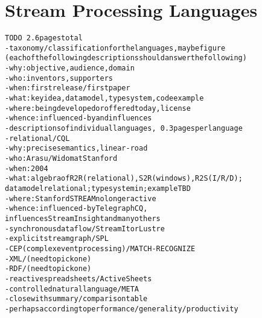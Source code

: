\section{Stream Processing Languages}\label{sec:languages}

\begin{alltt}TODO\scriptsize ~2.6 pages total
- taxonomy/classification for the languages, maybe figure
  (each of the following descriptions should answer the following)
  - why: objective, audience, domain
  - who: inventors, supporters
  - when: first release / first paper
  - what: key idea, data model, type system, code example
  - where: being developed or offered today, license
  - whence: influenced-by and influences
- descriptions of individual languages, ~0.3 pages per language
  - relational / CQL \cite{arasu_babu_widom_2006}
    - why: precise semantics \cite{arasu_widom_2004}, linear-road \cite{arasu_et_al_2004}
    - who: Arasu/Widom at Stanford
    - when: 2004
    - what: algebra of R2R (relational), S2R (windows), R2S (I/R/D);
      data model relational; type system in \cite{soule_et_al_2016}; example TBD
    - where: Stanford STREAM no longer active
    - whence: influenced-by TelegraphCQ \cite{chandrasekaran_et_al_2003},
      influences StreamInsight \cite{ali_et_al_2009} and many others
  - synchronous dataflow / StreamIt \cite{thies_et_al_2002} or Lustre
  - explicit stream graph / SPL \cite{hirzel_schneider_gedik_2017} \cite{soule_et_al_2010}
  - CEP (complex event processing) / MATCH-RECOGNIZE \cite{zemke_et_al_2007} \cite{hirzel_2012}
  - XML / (need to pick one)
  - RDF / (need to pick one)
  - reactive spreadsheets / ActiveSheets \cite{vaziri_et_al_2014}
  - controlled natural language / META \cite{arnold_et_al_2016}
- close with summary/comparison table
  - perhaps according to performance/generality/productivity
\end{alltt}
